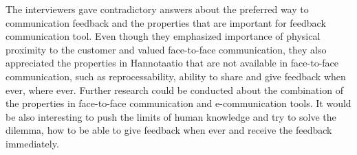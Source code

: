 \documentclass[english,12pt,a4paper,pdftex]{article}
\begin{document}
The interviewers gave contradictory answers about the preferred way to communication feedback and the properties that are important for feedback communication tool. Even though they emphasized importance of physical proximity to the customer and valued face-to-face communication, they also appreciated the properties in Hannotaatio that are not available in face-to-face communication, such as reprocessability, ability to share and give feedback when ever, where ever. Further research could be conducted about the combination of the properties in face-to-face communication and e-communication tools. It would be also interesting to push the limits of human knowledge and try to solve the dilemma, how to be able to give feedback when ever and receive the feedback immediately.

\end{document}

